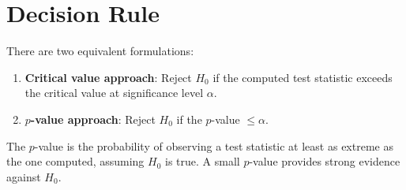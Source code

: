 \section{Decision Rule}

\begin{theorem}
There are two equivalent formulations:
\begin{enumerate}
  \item \textbf{Critical value approach}: Reject $H_0$ if the computed test statistic
        exceeds the critical value at significance level $\alpha$.
  \item \textbf{$p$-value approach}: Reject $H_0$ if the $p$-value $\leq \alpha$.
\end{enumerate}
\end{theorem}

\begin{remark}
The $p$-value is the probability of observing a test statistic at least as extreme as
the one computed, assuming $H_0$ is true. A small $p$-value provides strong evidence
against $H_0$.
\end{remark}
